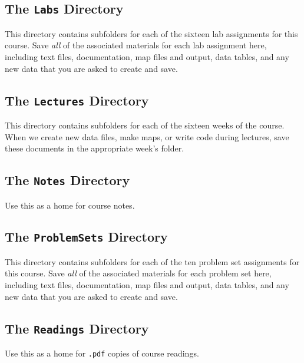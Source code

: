 \documentclass[]{book}
\begin{document}
\subsection{\texorpdfstring{The \texttt{Labs}
Directory}{The Labs Directory}}\label{the-labs-directory}

This directory contains subfolders for each of the sixteen lab
assignments for this course. Save \emph{all} of the associated materials
for each lab assignment here, including text files, documentation, map
files and output, data tables, and any new data that you are asked to
create and save.

\subsection{\texorpdfstring{The \texttt{Lectures}
Directory}{The Lectures Directory}}\label{the-lectures-directory}

This directory contains subfolders for each of the sixteen weeks of the
course. When we create new data files, make maps, or write code during
lectures, save these documents in the appropriate week's folder.

\subsection{\texorpdfstring{The \texttt{Notes}
Directory}{The Notes Directory}}\label{the-notes-directory}

Use this as a home for course notes.

\subsection{\texorpdfstring{The \texttt{ProblemSets}
Directory}{The ProblemSets Directory}}\label{the-problemsets-directory}

This directory contains subfolders for each of the ten problem set
assignments for this course. Save \emph{all} of the associated materials
for each problem set here, including text files, documentation, map
files and output, data tables, and any new data that you are asked to
create and save.

\subsection{\texorpdfstring{The \texttt{Readings}
Directory}{The Readings Directory}}\label{the-readings-directory}

Use this as a home for \texttt{.pdf} copies of course readings.
\end{document}
